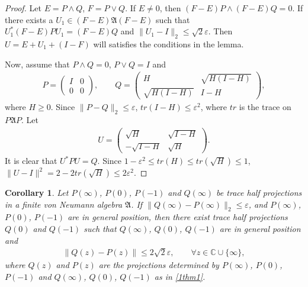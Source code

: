 \documentclass[a4paper,10pt]{amsart}
\newtheorem{corollary}{Corollary}[section]
\newcommand{\AAA}{\mathfrak A}
\newcommand{\C}{\mathbb C} %
\begin{document}
\begin{proof}
   Let $E = P \wedge Q$, $F = P \vee Q$. If $E \neq 0$, then
   $(F-E)P \wedge (F-E)Q = 0$. 
   If there exists a $U_1 \in (F-E)\AAA(F-E)$ such that
   $U_{1}^{*}(F-E)PU_1 = (F-E)Q$ and 
   $\|U_1 -I \|_2 \leq \sqrt{2}\varepsilon$. Then
   $U=E + U_1 + (I-F)$ will satisfies the conditions in the lemma.

   Now, assume that $P \wedge Q = 0$, $P \vee Q = I$ and
   \begin{align*}
      P = \begin{pmatrix}
          I & 0\\
          0 & 0
      \end{pmatrix}, \qquad 
      Q = \begin{pmatrix}
          H & \sqrt{H(I-H)}\\
          \sqrt{H(I-H)} & I-H
      \end{pmatrix},
   \end{align*}
   where $H \geq 0$. Since $\|P - Q\|_2 \leq \varepsilon$,
   $tr(I-H) \leq \varepsilon^2$, 
   where $tr$ is the trace on $P\AAA P$. 
   Let
   \begin{align*}
      U = \begin{pmatrix}
          \sqrt{H} & \sqrt{I-H}\\
          -\sqrt{I-H} & \sqrt{H}
      \end{pmatrix}. 
   \end{align*}
   It is clear that $U^{*}PU = Q$. Since $1-\varepsilon^2 \leq 
   tr(H) \leq tr(\sqrt{H}) \leq 1$, 
   $\|U-I\|^2 = 2-2tr(\sqrt{H}) \leq 2\varepsilon^2$.
\end{proof}

\begin{corollary} \label{h_cor1}
    Let $P(\infty)$, $P(0)$, $P(-1)$ and $Q(\infty)$ be trace half projections in a 
    finite von Neumann algebra $\AAA$. If 
    $\|Q(\infty)-P(\infty)\|_2 \leq \varepsilon$, and
    $P(\infty)$, $P(0)$, $P(-1)$ are in general position, then
    there exist trace half projections $Q(0)$ and $Q(-1)$ such that
    $Q(\infty)$, $Q(0)$, $Q(-1)$ are in general position and
    \begin{align*}
        \|Q(z) - P(z)\| \leq 2\sqrt{2}\varepsilon, \qquad 
        \forall z \in \C \cup \{\infty\}, 
    \end{align*}
    where $Q(z)$ and $P(z)$ are the projections determined by  
    $P(\infty)$, $P(0)$, $P(-1)$ and $Q(\infty)$, $Q(0)$, $Q(-1)$ 
    as in \cref{1thm1}.
\end{corollary}
\end{document}
